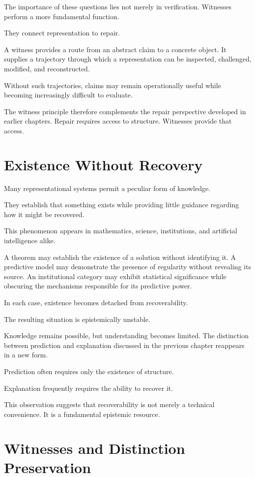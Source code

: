 \documentclass[11pt,oneside,openany]{book}
\begin{document}
The importance of these questions lies not merely in verification. Witnesses perform a more fundamental function.

They connect representation to repair.

A witness provides a route from an abstract claim to a concrete object. It supplies a trajectory through which a representation can be inspected, challenged, modified, and reconstructed.

Without such trajectories, claims may remain operationally useful while becoming increasingly difficult to evaluate.

The witness principle therefore complements the repair perspective developed in earlier chapters. Repair requires access to structure. Witnesses provide that access.

\section{Existence Without Recovery}

Many representational systems permit a peculiar form of knowledge.

They establish that something exists while providing little guidance regarding how it might be recovered.

This phenomenon appears in mathematics, science, institutions, and artificial intelligence alike.

A theorem may establish the existence of a solution without identifying it. A predictive model may demonstrate the presence of regularity without revealing its source. An institutional category may exhibit statistical significance while obscuring the mechanisms responsible for its predictive power.

In each case, existence becomes detached from recoverability.

The resulting situation is epistemically unstable.

Knowledge remains possible, but understanding becomes limited. The distinction between prediction and explanation discussed in the previous chapter reappears in a new form.

Prediction often requires only the existence of structure.

Explanation frequently requires the ability to recover it.

This observation suggests that recoverability is not merely a technical convenience. It is a fundamental epistemic resource.

\section{Witnesses and Distinction Preservation}
\end{document}
